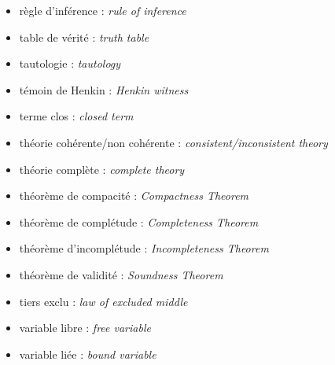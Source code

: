 \documentclass[11pt,class=report,crop=false]{standalone}
\begin{document}
\begin{itemize}
\item règle d'inférence : \emph{rule of inference}
\item table de vérité : \emph{truth table}
\item tautologie : \emph{tautology}
\item témoin de Henkin : \emph{Henkin witness}
\item terme clos : \emph{closed term}
\item théorie cohérente/non cohérente : \emph{consistent/inconsistent theory}
\item théorie complète : \emph{complete theory}
\item théorème de compacité : \emph{Compactness Theorem}
\item théorème de complétude : \emph{Completeness Theorem}
\item théorème d'incomplétude : \emph{Incompleteness Theorem}
\item théorème de validité : \emph{Soundness Theorem}
\item tiers exclu : \emph{law of excluded middle}

\item variable libre : \emph{free variable}
\item variable liée : \emph{bound variable}

\end{itemize}
\end{document}
